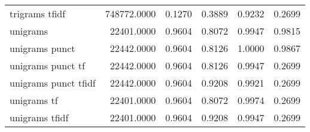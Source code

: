 \begin{tabular}{lrrrrr}
trigrams tfidf             &  748772.0000 & 0.1270 &       0.3889 &         0.9232 &               0.2699 \\
unigrams                   &   22401.0000 & 0.9604 &       0.8072 &         0.9947 &               0.9815 \\
unigrams punct             &   22442.0000 & 0.9604 &       0.8126 &         1.0000 &               0.9867 \\
unigrams punct tf          &   22442.0000 & 0.9604 &       0.8126 &         0.9947 &               0.2699 \\
unigrams punct tfidf       &   22442.0000 & 0.9604 &       0.9208 &         0.9921 &               0.2699 \\
unigrams tf                &   22401.0000 & 0.9604 &       0.8072 &         0.9974 &               0.2699 \\
unigrams tfidf             &   22401.0000 & 0.9604 &       0.9208 &         0.9947 &               0.2699 \\
\bottomrule
\end{tabular}
